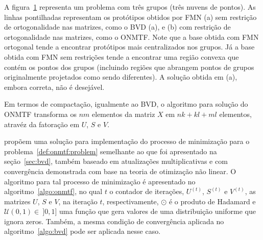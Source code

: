\documentclass[
    12pt,                %
    oneside,            %
    a4paper,            %
    english,            %
    brazil                %
    ]{abntex2ppgsi}
\begin{document}
\begin{figure} [htpb]

\label{fig:bvdvsonmtf}
\end{figure}

A figura~\ref{fig:bvdvsonmtf} representa um problema com três grupos (três nuvens de pontos).
As linhas pontilhadas representam os protótipos obtidos por FMN (a) sem restrição de ortogonalidade nas matrizes, como o BVD (a), e (b) com restrição de ortogonalidade nas matrizes, como o ONMTF.
Note que a base obtida com FMN ortogonal tende a encontrar protótipos mais centralizados nos grupos.
Já a base obtida com FMN sem restrições tende a encontrar uma região convexa que contém os pontos dos grupos (incluindo regiões que abrangem pontos de grupos originalmente projetados como sendo diferentes).
A solução obtida em (a), embora correta, não é desejável.

Em termos de compactação, igualmente ao BVD, o algoritmo para solução do ONMTF transforma os $nm$ elementos da matriz $X$ em $nk + kl + ml$ elementos, atravéz da fatoração em $U$, $S$ e $V$.

 propõem uma solução para implementação do processo de minimização para o problema~\ref{def:onmtf:problem} semelhante ao que foi apresentado na seção~\ref{sec:bvd}, também baseado em atualizações multiplicativas e com convergência demonstrada com base na teoria de otimização não linear.
O algoritmo para tal processo de minimização é apresentado no algoritmo~\ref{algo:onmtf}, no qual $t$ o contador de iterações, $U^{(t)}$, $S^{(t)}$ e $V^{(t)}$, as matrizes $U$, $S$ e $V$, na iteração $t$, respectivamente, $\odot$ é o produto de Hadamard e $\mathcal{U}(0, 1) \in~]0, 1]$ uma função que gera valores de uma distribuição uniforme que ignora zeros.
Também, a mesma condição de convergência aplicada no algoritmo~\ref{algo:bvd} pode ser aplicada nesse caso.
\end{document}
